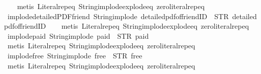 \begin{isabellebody}
%
\isadelimproof
\ \ %
\endisadelimproof
%
\isatagproof
{}\isamarkupfalse%
\ {\isacharparenleft}metis\ Literal{\isachardot}rep{\isacharunderscore}eq\ String{\isachardot}implode{\isacharunderscore}explode{\isacharunderscore}eq\ zero{\isacharunderscore}literal{\isachardot}rep{\isacharunderscore}eq{\isacharparenright}%
\endisatagproof
{\isafoldproof}%
%
\isadelimproof
\isanewline
%
\endisadelimproof
\isanewline
{}\isamarkupfalse%
\ implode{\isacharunderscore}detailedPDF{\isacharunderscore}friend{\isacharcolon}\ {\isachardoublequoteopen}String{\isachardot}implode\ {\isacharprime}{\isacharprime}detailed{\isacharunderscore}pdf{\isacharunderscore}of{\isacharunderscore}friendID{\isacharprime}{\isacharprime}\ {\isacharequal}\ STR\ {\isacharprime}{\isacharprime}detailed{\isacharunderscore}pdf{\isacharunderscore}of{\isacharunderscore}friendID{\isacharprime}{\isacharprime}{\isachardoublequoteclose}\isanewline
%
\isadelimproof
\ \ %
\endisadelimproof
%
\isatagproof
{}\isamarkupfalse%
\ {\isacharparenleft}metis\ Literal{\isachardot}rep{\isacharunderscore}eq\ String{\isachardot}implode{\isacharunderscore}explode{\isacharunderscore}eq\ zero{\isacharunderscore}literal{\isachardot}rep{\isacharunderscore}eq{\isacharparenright}%
\endisatagproof
{\isafoldproof}%
%
\isadelimproof
\isanewline
%
\endisadelimproof
\isanewline
{}\isamarkupfalse%
\ implode{\isacharunderscore}paid{\isacharcolon}\ {\isachardoublequoteopen}String{\isachardot}implode\ {\isacharprime}{\isacharprime}paid{\isacharprime}{\isacharprime}\ {\isacharequal}\ STR\ {\isacharprime}{\isacharprime}paid{\isacharprime}{\isacharprime}{\isachardoublequoteclose}\isanewline
%
\isadelimproof
\ \ %
\endisadelimproof
%
\isatagproof
{}\isamarkupfalse%
\ {\isacharparenleft}metis\ Literal{\isachardot}rep{\isacharunderscore}eq\ String{\isachardot}implode{\isacharunderscore}explode{\isacharunderscore}eq\ zero{\isacharunderscore}literal{\isachardot}rep{\isacharunderscore}eq{\isacharparenright}%
\endisatagproof
{\isafoldproof}%
%
\isadelimproof
\isanewline
%
\endisadelimproof
\isanewline
{}\isamarkupfalse%
\ implode{\isacharunderscore}free{\isacharcolon}\ {\isachardoublequoteopen}String{\isachardot}implode\ {\isacharprime}{\isacharprime}free{\isacharprime}{\isacharprime}\ {\isacharequal}\ STR\ {\isacharprime}{\isacharprime}free{\isacharprime}{\isacharprime}{\isachardoublequoteclose}\isanewline
%
\isadelimproof
\ \ %
\endisadelimproof
%
\isatagproof
{}\isamarkupfalse%
\ {\isacharparenleft}metis\ Literal{\isachardot}rep{\isacharunderscore}eq\ String{\isachardot}implode{\isacharunderscore}explode{\isacharunderscore}eq\ zero{\isacharunderscore}literal{\isachardot}rep{\isacharunderscore}eq{\isacharparenright}%

\end{isabellebody}
